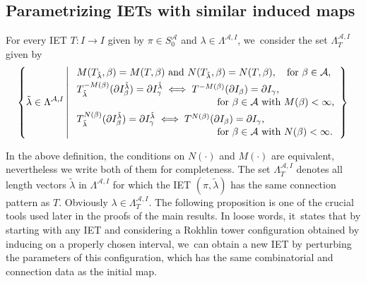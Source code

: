 \documentclass[JEP,XML,SOM,Unicode,NoEqCountersInSection,NoFloatCountersInSection,published]{cedram}
\theoremstyle{plain}
\theoremstyle{definition}
\newcommand{\A}{\mathcal{A}}
\begin{document}
\subsection{Parametrizing IETs with similar induced maps}
For every IET $T: I \to I$ given by $\pi \in S_0^\A$ and $\lambda\in\Lambda^{\A,I}$, we~consider the set $\Lambda^{\mathcal A,I}_T$ given by
\begin{equation}
\label{eq:nbhd_connections}
\left\{\tilde\lambda\in\Lambda^{\A,I} \left|\;
\begin{array}{l}
M(T_{\tilde{\lambda}},\beta)=M(T,\beta)\ \text{and}\ N(T_{\tilde{\lambda}},\beta)=N(T,\beta), \quad \text{for}\ \beta\in\A, \\[3pt]
T_{\tilde{\lambda}}^{-M(\beta)}(\partial I_\beta^{\tilde\lambda})=\partial I_\gamma^{\tilde\lambda}\iff T^{-M(\beta)}(\partial I_\beta)=\partial I_\gamma,\\
\hspace*{5cm} \text{for $\beta \in \A$ with }M(\beta)<\infty,\\[3pt]
T_{\tilde{\lambda}}^{N(\beta)}(\partial I_\beta^{\tilde\lambda})=\partial I_\gamma^{\tilde\lambda}\iff T^{N(\beta)}(\partial I_\beta)=\partial I_\gamma, \\
\hspace*{5cm}\text{for $\beta \in \A$ with }N(\beta)<\infty.
\end{array}\right\} \right.
\end{equation}

In the above definition, the conditions on $N(\cdot)$ and $M(\cdot)$ are equivalent, nevertheless we write both of them for completeness. The set $\Lambda^{\mathcal A,I}_T$ denotes all length vectors $\tilde \lambda$ in $\Lambda^{\A,I}$ for which the IET $(\pi, \tilde \lambda)$ has the same connection pattern as $T$. Obviously $\lambda\in \Lambda^{\mathcal A,I}_T$. The following proposition is one of the crucial tools used later in the proofs of the main results. In loose words, it~states that by starting with any IET and considering a Rokhlin tower configuration obtained by inducing on a properly chosen interval, we~can obtain a new IET by perturbing the parameters of this configuration, which has the same combinatorial and connection data as the initial map.
\end{document}
